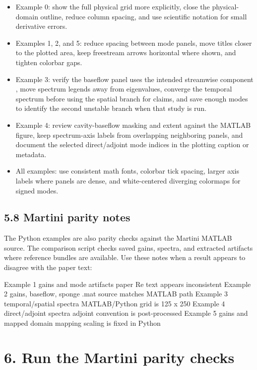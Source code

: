 \documentclass[11pt,a4paper]{article}
\newcommand{\code}[1]{\texttt{\detokenize{#1}}}
\begin{document}
\begin{itemize}[leftmargin=2em]
  \item Example 0: show the full physical grid more explicitly, close the physical-domain outline, reduce column spacing, and use scientific notation for small derivative errors.
  \item Examples 1, 2, and 5: reduce spacing between mode panels, move titles closer to the plotted area, keep freestream arrows horizontal where shown, and tighten colorbar gaps.
  \item Example 3: verify the baseflow panel uses the intended streamwise component \code{W}, move spectrum legends away from eigenvalues, converge the temporal spectrum before using the spatial branch for claims, and save enough modes to identify the second unstable branch when that study is run.
  \item Example 4: review cavity-baseflow masking and extent against the MATLAB figure, keep spectrum-axis labels from overlapping neighboring panels, and document the selected direct/adjoint mode indices in the plotting caption or metadata.
  \item All examples: use consistent math fonts, colorbar tick spacing, larger axis labels where panels are dense, and white-centered diverging colormaps for signed modes.
\end{itemize}

\subsection*{5.8 Martini parity notes}

The Python examples are also parity checks against the Martini MATLAB source. The comparison script checks saved gains, spectra, and extracted artifacts where reference bundles are available. Use these notes when a result appears to disagree with the paper text:

\begin{outputbox}
Example 1  gains and mode artifacts   paper Re text appears inconsistent
Example 2  gains, baseflow, sponge    .mat source matches MATLAB path
Example 3  temporal/spatial spectra   MATLAB/Python grid is 125 x 250
Example 4  direct/adjoint spectra     adjoint convention is post-processed
Example 5  gains and mapped domain    mapping scaling is fixed in Python
\end{outputbox}

\section*{6. Run the Martini parity checks}
\end{document}
